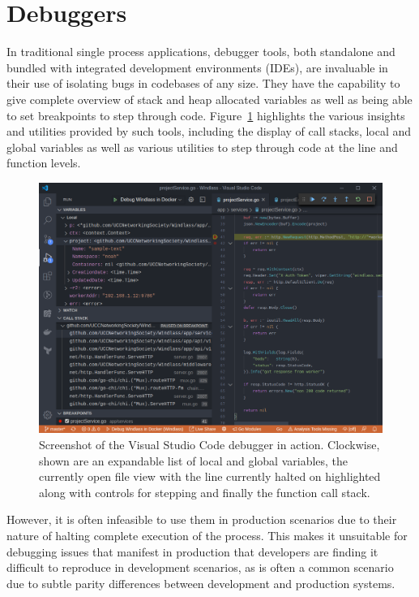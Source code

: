 \documentclass[12pt,pdftex,titlepage]{report}
\begin{document}
        \section{Debuggers}
            In traditional single process applications, debugger tools, both standalone and bundled with integrated development environments (IDEs), are invaluable in their
            use of isolating bugs in codebases of any size. They have the capability to give complete overview of stack and heap allocated variables as well as being able to set
            breakpoints to step through code. Figure~\ref{fig:debugger} highlights the various insights and utilities provided by such tools, including the display of call stacks,
            local and global variables as well as various utilities to step through code at the line and function levels.

            \begin{figure}[hbt!]
                \centering
                \includegraphics[scale=0.335]{debugger.png}
                \caption{Screenshot of the Visual Studio Code debugger in action. Clockwise, shown are an expandable list of local and global variables, the currently open file view
                with the line currently halted on highlighted along with controls for stepping and finally the function call stack.}
                \label{fig:debugger}
            \end{figure}
            
            However, it is often infeasible to use them in production scenarios due to their nature of halting complete execution of the process.
            This makes it unsuitable for debugging issues that manifest in production that developers are finding it difficult to reproduce in development scenarios, as is often
            a common scenario due to subtle parity differences between development and production systems.
\end{document}
